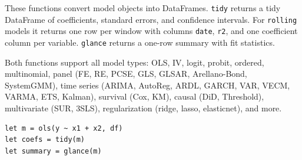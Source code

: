 These functions convert model objects into DataFrames. \texttt{tidy}
returns a tidy DataFrame of coefficients, standard errors, and confidence
intervals. For \texttt{rolling} models it returns one row per window
with columns \texttt{date}, \texttt{r2}, and one coefficient column per
variable. \texttt{glance} returns a one-row summary with fit statistics.

Both functions support all model types: OLS, IV, logit, probit, ordered,
multinomial, panel (FE, RE, PCSE, GLS, GLSAR, Arellano-Bond, SystemGMM),
time series (ARIMA, AutoReg, ARDL, GARCH, VAR, VECM, VARMA, ETS, Kalman),
survival (Cox, KM), causal (DiD, Threshold), multivariate (SUR, 3SLS),
regularization (ridge, lasso, elasticnet), and more.

\begin{lstlisting}[caption={Tidy and glance}]
let m = ols(y ~ x1 + x2, df)
let coefs = tidy(m)
let summary = glance(m)
\end{lstlisting}
